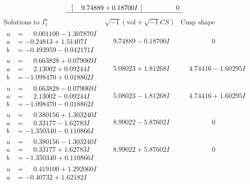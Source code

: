 \documentclass[1p]{elsarticle_modified}
\theoremstyle{definition}
\newcommand{\I}{\sqrt{-1}}
\begin{document}
$$\begin{array}{c|c|c}
 & \phantom{-}9.74889 + 0.18700 I & \phantom{-0.000000 } 0\\
 \hline 
 \end{array}$$\newpage$$\begin{array}{c|c|c}  
\text{Solutions to }I^u_{1}& \I (\text{vol} + \sqrt{-1}CS) & \text{Cusp shape}\\
 \hline 
\begin{aligned}
u &= \phantom{-}0.001100 - 1.307870 I \\
a &= -0.24813 + 1.51407 I \\
b &= -0.493959 - 0.042171 I\end{aligned}
 & \phantom{-}9.74889 - 0.18700 I & \phantom{-0.000000 } 0 \\ \hline\begin{aligned}
u &= \phantom{-}0.663828 + 0.079069 I \\
a &= \phantom{-}2.13002 + 0.09244 I \\
b &= -1.098470 + 0.018862 I\end{aligned}
 & \phantom{-}5.08023 + 1.81268 I & \phantom{-}4.74416 - 1.60295 I \\ \hline\begin{aligned}
u &= \phantom{-}0.663828 - 0.079069 I \\
a &= \phantom{-}2.13002 - 0.09244 I \\
b &= -1.098470 - 0.018862 I\end{aligned}
 & \phantom{-}5.08023 - 1.81268 I & \phantom{-}4.74416 + 1.60295 I \\ \hline\begin{aligned}
u &= \phantom{-}0.380156 + 1.303240 I \\
a &= \phantom{-}0.33177 - 1.62783 I \\
b &= -1.350340 - 0.110866 I\end{aligned}
 & \phantom{-}8.99022 - 5.87602 I & \phantom{-0.000000 } 0 \\ \hline\begin{aligned}
u &= \phantom{-}0.380156 - 1.303240 I \\
a &= \phantom{-}0.33177 + 1.62783 I \\
b &= -1.350340 + 0.110866 I\end{aligned}
 & \phantom{-}8.99022 + 5.87602 I & \phantom{-0.000000 } 0 \\ \hline\begin{aligned}
u &= \phantom{-}0.419100 + 1.292060 I \\
a &= -0.40732 + 1.62182 I \\

\end{aligned}
\end{array}$$
\end{document}
